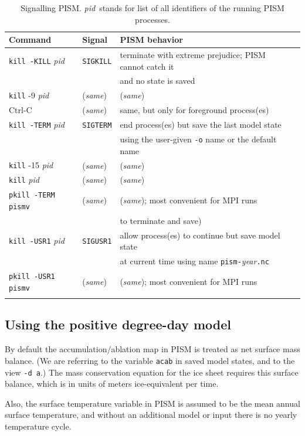 \documentclass[11pt,final]{amsart}
\begin{document}
\newcommand\pid{\textsl{pid}}
\newcommand\same{(\textsl{same})}
\begin{table}[ht]
\caption{Signalling PISM.  \pid~stands for list of all identifiers of the running PISM processes.}\label{tab:signals}
\begin{tabular}{@{}llll}\hline
\textbf{Command}\phantom{bobbob} & \textbf{Signal}\phantom{bobbob} & \textbf{PISM behavior} \\ \hline
\texttt{kill -KILL} \pid & \texttt{SIGKILL} & terminate with extreme prejudice; PISM cannot catch it \\
 & & and no state is saved \\
\texttt{kill} -9 \pid & \same & \same \\
Ctrl-C & \same & same, but only for foreground process(es)  \\ \hline
\texttt{kill -TERM} \pid & \texttt{SIGTERM} & end process(es) but save the last model state \\
 &  & using the user-given \verb|-o| name or the default name \\
\texttt{kill} -15 \pid & \same & \same \\
\texttt{kill} \pid & \same & \same \\
\texttt{pkill -TERM pismv} & \same & \same; most convenient for MPI runs \\ 
 &  & to terminate and save) \\ \hline
\texttt{kill -USR1} \pid & \texttt{SIGUSR1} & allow process(es) to continue but save model state \\
 &  & at current time using name \texttt{pism-}\textsl{year}\texttt{.nc} \\
\texttt{pkill -USR1 pismv} & \same & \same; most convenient for MPI runs \\
\hline\normalsize
\end{tabular}
\end{table}


\subsection{Using the positive degree-day model}  \label{subsect:pdd}  By default the accumulation/ablation map in PISM is treated as net surface mass balance.  (We are referring to the variable \verb|acab| in saved model states, and to the view \verb|-d a|.)  The mass conservation equation for the ice sheet requires this surface balance, which is in units of meters ice-equivalent per time.

Also, the surface temperature variable in PISM is assumed to be the mean annual surface temperature, and without an additional model or input there is no yearly temperature cycle.
\end{document}
